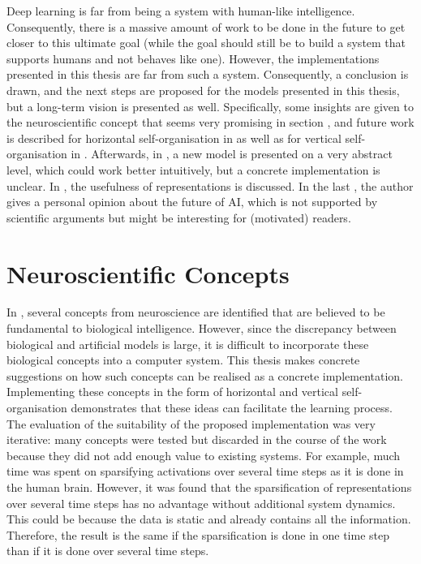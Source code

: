 Deep learning is far from being a system with human-like intelligence. Consequently, there is a massive amount of work to be done in the future to get closer to this ultimate goal (while the goal should still be to build a system that supports humans and not behaves like one). However, the implementations presented in this thesis are far from such a system. Consequently, a conclusion is drawn, and the next steps are proposed for the models presented in this thesis, but a long-term vision is presented as well. Specifically, some insights are given to the neuroscientific concept that seems very promising in section , and future work is described for horizontal self-organisation in  as well as for vertical self-organisation in . Afterwards, in , a new model is presented on a very abstract level, which could work better intuitively, but a concrete implementation is unclear. In , the usefulness of representations is discussed. In the last , the author gives a personal opinion about the future of AI, which is not supported by scientific arguments but might be interesting for (motivated) readers.



\section{Neuroscientific Concepts}
In , several concepts from neuroscience are identified that are believed to be fundamental to biological intelligence. However, since the discrepancy between biological and artificial models is large, it is difficult to incorporate these biological concepts into a computer system. This thesis makes concrete suggestions on how such concepts can be realised as a concrete implementation. Implementing these concepts in the form of horizontal and vertical self-organisation demonstrates that these ideas can facilitate the learning process. The evaluation of the suitability of the proposed implementation was very iterative: many concepts were tested but discarded in the course of the work because they did not add enough value to existing systems. For example, much time was spent on sparsifying activations over several time steps as it is done in the human brain. However, it was found that the sparsification of representations over several time steps has no advantage without additional system dynamics. This could be because the data is static and already contains all the information. Therefore, the result is the same if the sparsification is done in one time step than if it is done over several time steps.


